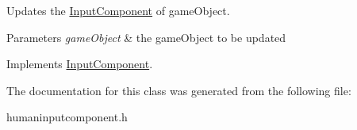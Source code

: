Updates the \hyperlink{classInputComponent}{Input\-Component} of game\-Object. 


\begin{DoxyParams}{Parameters}
{\em game\-Object} & the game\-Object to be updated \\
\hline
\end{DoxyParams}


Implements \hyperlink{classInputComponent_a93e790f7279e842ee249fefe7dbf7b32}{Input\-Component}.



The documentation for this class was generated from the following file\-:\begin{DoxyCompactItemize}
\item 
humaninputcomponent.\-h\end{DoxyCompactItemize}
